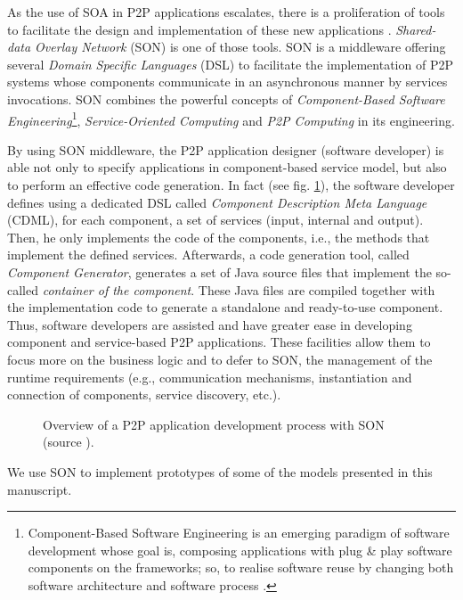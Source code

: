 As the use of SOA in P2P applications escalates, there is a proliferation of tools to facilitate the design and implementation of these new applications \cite{kaur2013design}. \textit{Shared-data Overlay Network} (SON) \cite{SON} is one of those tools. SON is a middleware offering several \textit{Domain Specific Languages} (DSL) to facilitate the implementation of P2P systems whose components communicate in an asynchronous manner by services invocations. SON combines the powerful concepts of \textit{Component-Based Software Engineering}\footnote{Component-Based Software Engineering is an emerging paradigm of software development whose goal is, composing applications with plug \& play software components on the frameworks; so, to realise software reuse by changing both software architecture and software process \cite{aoyama1998new}.}, \textit{Service-Oriented Computing} and \textit{P2P Computing} in its engineering. 

By using SON middleware, the P2P application designer (software developer) is able not only to specify applications in component-based service model, but also to perform an effective code generation. In fact (see fig. \ref{chap1:fig:son-model}), the software developer defines using a dedicated DSL called \textit{Component Description Meta Language} (CDML), for each component, a set of services (input, internal and output). Then, he only implements the code of the components, i.e., the methods that implement the defined services. Afterwards, a code generation tool, called \textit{Component Generator}, generates a set of Java source files that implement the so-called \textit{container of the component}. These Java files are compiled together with the implementation code to generate a standalone and ready-to-use component. 
Thus, software developers are assisted and have greater ease in developing component and service-based P2P applications. These facilities allow them to focus more on the business logic and to defer to SON, the management of the runtime requirements (e.g., communication mechanisms, instantiation and connection of components, service discovery, etc.).
\begin{figure}[ht!]
	\noindent
	\caption{Overview of a P2P application development process with SON (source \cite{SON}).}
	\label{chap1:fig:son-model}
\end{figure}
We use SON to implement prototypes of some of the models presented in this manuscript.


